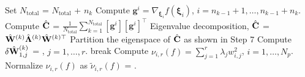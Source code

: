 \begin{breakablealgorithm}
\begin{algorithmic}[1]
		\State Set $N_\text{total}$ = $N_\text{total}$ + $n_k$ 
		\State Compute $\bm{g}^i = \nabla_{\bm{\xi}_i}f(\bm{\xi}_i)$, 
             	$i=n_{k-1}+1, \ldots, n_{k-1}+n_k$.  
		\State Compute $\hat{\mathbf{{C}}}$ = 
        	$\frac{1}{N_\text{total}}\sum\limits_{k=1}^{N_\text{total}}[\bm{g}^i][\bm{g}^i]^\top$
		\State Eigenvalue decomposition, $\hat{\mathbf{{C}}}$ = $\hat{\mathbf{{W}}}^{(k)}\hat{\mathbf{{\Lambda}}}^{(k)}
		 \hat{\mathbf{{W}}}^{(k)\top}$
		\State Partition the eigenspace of $\hat{\mathbf{{C}}}$ as shown in Step 7
		\State Compute $\delta \hat{\mathbf{{W}}}_{1,j}^{(k)}$ = 
                       , 
                       $j = 1,\ldots,r$.
			\State break
		\EndIf
	\EndLoop
	\State Compute $\nu_{i,r}(f) = \sum\limits_{j=1}^{r} \lambda_j w_{i,j}^2$,
	$i=1,\ldots,N_p$.
	\State Normalize $\nu_{i,r}(f)$ as $\tilde{\nu}_{i,r}(f)$ = .
	
    \EndProcedure
  \end{algorithmic}
  \label{alg:grad}
\end{breakablealgorithm}
\bigskip

